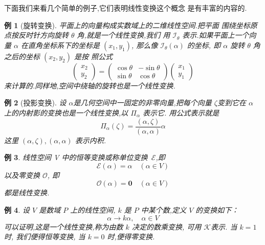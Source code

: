\documentclass[13pt]{beamer}
\newtheorem{exa}{例}
\def\E{\mathscr{E}}
\def\O{\mathscr{O}}
\def\a{\alpha}
\begin{document}
\begin{frame}
下面我们来看几个简单的例子,它们表明线性变换这个概念 是有丰富的内容的.
\begin{exa}[{旋转变换}]
平面上的向量构成实数域上的二维线性空间.把平面 围绕坐标原点按反时针方向旋转 $\theta$ 角,就是一个线性变换,我们 用 $\mathscr{I}_{\theta}$ 表示.如果平面上一个向量 ${\alpha}$ 在直角坐标系下的坐标是 $\left( x_1,y_1 \right)$, 那么像 $\mathscr{I}_{\theta}({\alpha})$ 的坐标, 即 ${\alpha}$ 旋转 $\theta$ 角之后的坐标 $\left(x_2, y_2\right)$ 是按
照公式
\[
\left(\begin{array}{l}
x_2 \\
y_2
\end{array}\right)=\left(\begin{array}{ll}
\cos \theta & -\sin \theta \\
\sin \theta & \cos \theta
\end{array}\right)
\left(\begin{array}{l}
x_1 \\
y_1
\end{array}\right)
\]
来计算的.同样地,空间中绕轴的旋转也是一个线性变换. 
\end{exa}
\end{frame}


\begin{frame}
	\begin{exa}[投影变换]
设 $\a$是几何空间中一固定的非零向量,把每个向量 $\zeta$变到它在 ${\alpha}$ 上的内射影的变换也是一个线性变换,以 $\Pi_{\alpha}$ 表示它.
用公式表示就是
\[
\Pi_{\a}(\zeta)=\frac{({\alpha}, \zeta)}{({\alpha}, {\alpha})} {\alpha}
\]
这里 $({\alpha}, {\zeta}),({\alpha}, {\alpha})$ 表示内积.
	\end{exa}



\end{frame}

\begin{frame}
\begin{exa}
	线性空间 V 中的\alert{恒等变换}或称\alert{单位变换}\, $\mathscr{E}$,即
	\[
	\E({\alpha})={\alpha} \quad({\alpha} \in V)
	\]
	以及\alert{零变换} $\mathscr{O}$, 即
	\[
	\O({\alpha})=\mathbf{0} \quad({\alpha} \in V)
	\]
	都是线性变换. 
\end{exa}

\begin{exa}
	设 $V$ 是数域 $P$ 上的线性空间, $k$ 是 $P$ 中某个数,定义 $V$ 的变换如下：
$${\alpha} \rightarrow k {\alpha}, \quad {\alpha} \in V$$
可以证明,这是一个线性变换,称为由数 $k$ 决定的\alert{数乘变换}, 可用 $\mathscr{K}$表示. 
当 $k=1$ 时, 我们便得恒等变换,  当 $k=0$ 时,便得零变换.
\end{exa}
\end{frame}
\end{document}
